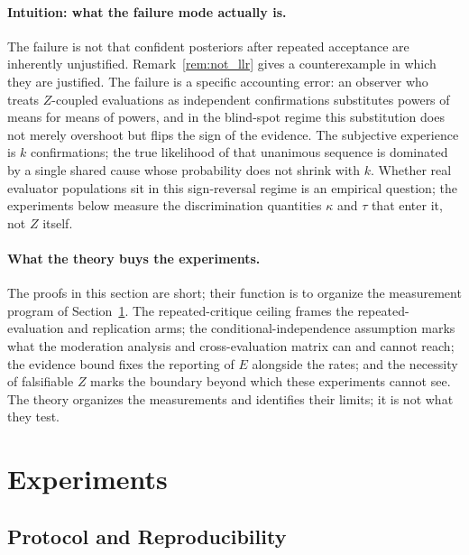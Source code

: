 \documentclass[a4paper,journal]{IAENGtran}
\begin{document}
\paragraph{Intuition: what the failure mode actually is.}
The failure is not that confident posteriors after repeated acceptance are inherently
unjustified. Remark~\ref{rem:not_llr} gives a counterexample in which they are
justified. The failure is a specific accounting error: an observer who treats
$Z$-coupled evaluations as independent confirmations substitutes powers of means for
means of powers, and in the blind-spot regime this substitution does not merely
overshoot but flips the sign of the evidence. The subjective experience is $k$
confirmations; the true likelihood of that unanimous sequence is dominated by a single
shared cause whose probability does not shrink with $k$. Whether real evaluator
populations sit in this sign-reversal regime is an empirical question; the experiments
below measure the discrimination quantities $\kappa$ and $\tau$ that enter it, not $Z$
itself.

\paragraph{What the theory buys the experiments.} The proofs in this section are short;
their function is to organize the measurement program of Section~\ref{sec:empirical}.
The repeated-critique ceiling frames the repeated-evaluation and replication arms; the
conditional-independence assumption marks what the moderation analysis and
cross-evaluation matrix can and cannot reach; the evidence bound fixes the reporting of
$E$ alongside the rates; and the necessity of falsifiable $Z$ marks the boundary beyond
which these experiments cannot see. The theory organizes the measurements and identifies
their limits; it is not what they test.

\section{Experiments}
\label{sec:empirical}

\subsection{Protocol and Reproducibility}
\label{sec:protocol}
\end{document}
